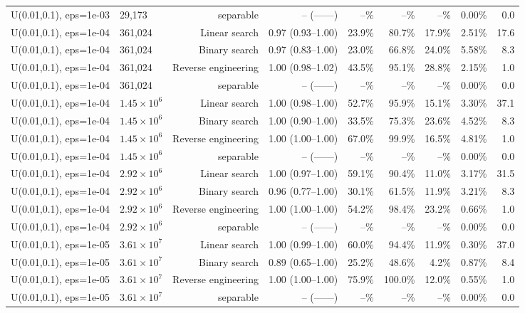 \begin{tabular}{llrrrrrrr}
U(0.01,0.1), eps=1e-03 & 29,173 & separable & -- (------) & --\% & --\% & --\% & 0.00\% & 0.0 \\
U(0.01,0.1), eps=1e-04 & 361,024 & Linear search & 0.97 (0.93--1.00) & 23.9\% & 80.7\% & 17.9\% & 2.51\% & 17.6 \\
U(0.01,0.1), eps=1e-04 & 361,024 & Binary search & 0.97 (0.83--1.00) & 23.0\% & 66.8\% & 24.0\% & 5.58\% & 8.3 \\
U(0.01,0.1), eps=1e-04 & 361,024 & Reverse engineering & 1.00 (0.98--1.02) & 43.5\% & 95.1\% & 28.8\% & 2.15\% & 1.0 \\
U(0.01,0.1), eps=1e-04 & 361,024 & separable & -- (------) & --\% & --\% & --\% & 0.00\% & 0.0 \\
U(0.01,0.1), eps=1e-04 & $1.45\times 10^{6}$ & Linear search & 1.00 (0.98--1.00) & 52.7\% & 95.9\% & 15.1\% & 3.30\% & 37.1 \\
U(0.01,0.1), eps=1e-04 & $1.45\times 10^{6}$ & Binary search & 1.00 (0.90--1.00) & 33.5\% & 75.3\% & 23.6\% & 4.52\% & 8.3 \\
U(0.01,0.1), eps=1e-04 & $1.45\times 10^{6}$ & Reverse engineering & 1.00 (1.00--1.00) & 67.0\% & 99.9\% & 16.5\% & 4.81\% & 1.0 \\
U(0.01,0.1), eps=1e-04 & $1.45\times 10^{6}$ & separable & -- (------) & --\% & --\% & --\% & 0.00\% & 0.0 \\
U(0.01,0.1), eps=1e-04 & $2.92\times 10^{6}$ & Linear search & 1.00 (0.97--1.00) & 59.1\% & 90.4\% & 11.0\% & 3.17\% & 31.5 \\
U(0.01,0.1), eps=1e-04 & $2.92\times 10^{6}$ & Binary search & 0.96 (0.77--1.00) & 30.1\% & 61.5\% & 11.9\% & 3.21\% & 8.3 \\
U(0.01,0.1), eps=1e-04 & $2.92\times 10^{6}$ & Reverse engineering & 1.00 (1.00--1.00) & 54.2\% & 98.4\% & 23.2\% & 0.66\% & 1.0 \\
U(0.01,0.1), eps=1e-04 & $2.92\times 10^{6}$ & separable & -- (------) & --\% & --\% & --\% & 0.00\% & 0.0 \\
U(0.01,0.1), eps=1e-05 & $3.61\times 10^{7}$ & Linear search & 1.00 (0.99--1.00) & 60.0\% & 94.4\% & 11.9\% & 0.30\% & 37.0 \\
U(0.01,0.1), eps=1e-05 & $3.61\times 10^{7}$ & Binary search & 0.89 (0.65--1.00) & 25.2\% & 48.6\% & 4.2\% & 0.87\% & 8.4 \\
U(0.01,0.1), eps=1e-05 & $3.61\times 10^{7}$ & Reverse engineering & 1.00 (1.00--1.00) & 75.9\% & 100.0\% & 12.0\% & 0.55\% & 1.0 \\
U(0.01,0.1), eps=1e-05 & $3.61\times 10^{7}$ & separable & -- (------) & --\% & --\% & --\% & 0.00\% & 0.0 \\

\end{tabular}

